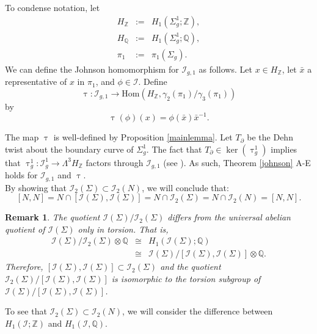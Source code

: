 \documentclass[a4paper]{amsproc}
\theoremstyle{TheoremNum}
\theoremstyle{Theorembold}
\theoremstyle{TheoremboldDef}
\newtheorem{rem}[thm]{Remark}
\theoremstyle{TheoremboldRem}
\theoremstyle{TheoremboldRem}
\begin{document}
To condense notation, let \begin{eqnarray*}
H_{\mathbb{Z}}&:=&H_1({\Sigma_{g}^1};{\mathbb{Z}}),\\
H_{\mathbb{Q}}&:=&H_1({\Sigma_{g}^1};{\mathbb{Q}}),\\
\pi_1&:=&\pi_1(\Sigma_{g}).
\end{eqnarray*}  
We can define the Johnson homomorphism for ${{\mathcal{I}}_{g,1}}$ as follows.
 Let $x\in H_{\mathbb{Z}}$, let $\bar{x}$ a representative of $x$ in ${\pi_1}$, and $\phi\in{\mathcal{I}}$. Define \[\uptau:{{\mathcal{I}}_{g,1}}\to\text{Hom}(H_{\mathbb{Z}},\gamma_2(\pi_1)/\gamma_3(\pi_1))\] by
 \[\uptau(\phi)(x)=\phi(\bar{x})\bar{x}^{-1}.\]

The map $\uptau$ is well-defined by Proposition \ref{mainlemma}. 
 Let $T_\partial$ be the Dehn twist about the boundary curve of ${\Sigma_{g}^1}$. The fact that $T_\partial\in\ker(\uptau_g^1)$ 
  implies that $\uptau_g^1: {{\mathcal{I}}_{g}^{1}}\to \Lambda^3H_{\mathbb{Z}}$ factors through ${{\mathcal{I}}_{g,1}}$ (see \cite{johnsonsurvey}). As such, Theorem \ref{johnson} A-E holds for ${{\mathcal{I}}_{g,1}}$ and $\uptau$.\\

By showing that ${{\mathcal{I}}_2(\Sigma)}\subset{{\mathcal{I}}_2(N)}$, we will conclude that: \[[N,N]=N\cap[{{\mathcal{I}}(\Sigma)},{{\mathcal{I}}(\Sigma)}]=N\cap{{\mathcal{I}}_2(\Sigma)}=N\cap{{\mathcal{I}}_2(N)}=[N,N].\] 

\begin{rem} The quotient ${{\mathcal{I}}(\Sigma)}/{{\mathcal{I}}_2(\Sigma)}$ differs from the universal abelian quotient of ${{\mathcal{I}}(\Sigma)}$ only in torsion. That is,
\begin{eqnarray*}{{\mathcal{I}}(\Sigma)}/{{\mathcal{I}}_2(\Sigma)}\otimes {\mathbb{Q}}&\cong& H_1({{\mathcal{I}}(\Sigma)};{\mathbb{Q}})\\ &\cong& {{\mathcal{I}}(\Sigma)}/[{{\mathcal{I}}(\Sigma)},{{\mathcal{I}}(\Sigma)}]\otimes {\mathbb{Q}}.\end{eqnarray*} Therefore, $[{{\mathcal{I}}(\Sigma)},{{\mathcal{I}}(\Sigma)}]\subset {{\mathcal{I}}_2(\Sigma)}$ and the quotient ${{\mathcal{I}}_2(\Sigma)}/[{{\mathcal{I}}(\Sigma)},{{\mathcal{I}}(\Sigma)}]$ is isomorphic to the torsion subgroup of ${{\mathcal{I}}(\Sigma)}/[{{\mathcal{I}}(\Sigma)},{{\mathcal{I}}(\Sigma)}]$.
\end{rem}

To see that ${{\mathcal{I}}_2(\Sigma)}\subset{{\mathcal{I}}_2(N)}$, we will consider the difference between $H_1({\mathcal{I}};{\mathbb{Z}})$ and $H_1({\mathcal{I}},{\mathbb{Q}})$.
 
\end{document}
